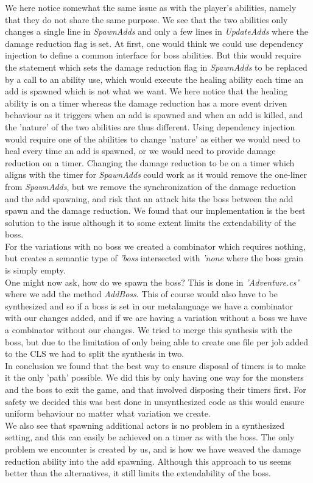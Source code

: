 We here notice somewhat the same issue as with the player's abilities, namely that they do not share the same purpose. We see that the two abilities only changes a single line in \textit{SpawnAdds} and only a few lines in \textit{UpdateAdds} where the damage reduction flag is set. At first, one would think we could use dependency injection to define a common interface for boss abilities. But this would require the statement which sets the damage reduction flag in \textit{SpawnAdds} to be replaced by a call to an ability use, which would execute the healing ability each time an add is spawned which is not what we want. We here notice that the healing ability is on a timer whereas the damage reduction has a more event driven behaviour as it triggers when an add is spawned and when an add is killed, and the 'nature' of the two abilities are thus different. Using dependency injection would require one of the abilities to change 'nature' as either we would need to heal every time an add is spawned, or we would need to provide damage reduction on a timer. Changing the damage reduction to be on a timer which aligns with the timer for \textit{SpawnAdds} could work as it would remove the one-liner from \textit{SpawnAdds}, but we remove the synchronization of the damage reduction and the add spawning, and risk that an attack hits the boss between the add spawn and the damage reduction. We found that our implementation is the best solution to the issue although it to some extent limits the extendability of the boss.\\
For the variations with no boss we created a combinator which requires nothing, but creates a semantic type of \textit{'boss} intersected with \textit{'none} where the boss grain is simply empty.\\

One might now ask, how do we spawn the boss? This is done in \textit{'Adventure.cs'} where we add the method \textit{AddBoss}. This of course would also have to be synthesized and so if a boss is set in our metalanguage we have a combinator with our changes added, and if we are having a variation without a boss we have a combinator without our changes. We tried to merge this synthesis with the boss, but due to the limitation of only being able to create one file per job added to the CLS we had to split the synthesis in two.\\

In conclusion we found that the best way to ensure disposal of timers is to make it the only 'path' possible. We did this by only having one way for the monsters and the boss to exit the game, and that involved disposing their timers first. For safety we decided this was best done in unsynthesized code as this would ensure uniform behaviour no matter what variation we create.\\
We also see that spawning additional actors is no problem in a synthesized setting, and this can easily be achieved on a timer as with the boss. The only problem we encounter is created by us, and is how we have weaved the damage reduction ability into the add spawning. Although this approach to us seems better than the alternatives, it still limits the extendability of the boss.